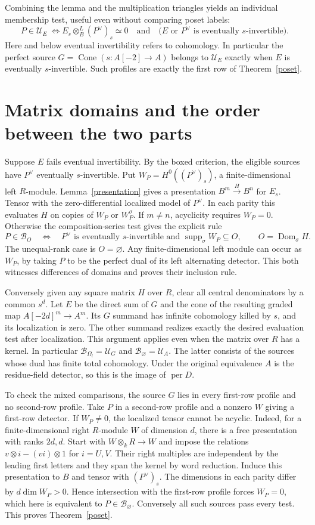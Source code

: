 \documentclass[11pt]{article}
\newcommand{\per}{\operatorname{per}}
\newcommand{\cone}{\operatorname{Cone}}
\newcommand{\supp}{\operatorname{supp}_{\sigma}}
\newcommand{\Dom}{\operatorname{Dom}_{\sigma}}
\newcommand{\prof}{\mathcal U}
\newcommand{\bb}{\mathcal B}
\begin{document}
Combining the lemma and the multiplication triangles yields an individual
membership test, useful even without comparing poset labels:
\[
 \boxed{\quad P\in\prof_E\ \Longleftrightarrow E_s\otimes_B^L(P^\vee)_s\simeq0\quad\text{and}\quad
 \big(E\text{ or }P^\vee\text{ is eventually }s\text{-invertible}\big).\quad}
\]
Here and below eventual invertibility refers to cohomology. In particular
the perfect source $G=\cone(s:A[-2]\to A)$ belongs to $\prof_E$
exactly when $E$ is eventually $s$-invertible. Such profiles are exactly
the first row of Theorem~\ref{poset}.

\section{Matrix domains and the order between the two parts}
Suppose $E$ fails eventual invertibility. By the boxed criterion, the
eligible sources have $P^\vee$ eventually $s$-invertible. Put
$W_P=H^0((P^\vee)_s)$, a finite-dimensional left $R$-module.
Lemma~\ref{presentation} gives a presentation $B^m\xrightarrow{H}B^n$
for $E_s$. Tensor with the zero-differential localized model of $P^\vee$.
In each parity this evaluates $H$ on copies of $W_P$ or $W_P^\sigma$.
If $m\ne n$, acyclicity requires $W_P=0$. Otherwise the composition-series
test gives the explicit rule
\[
  P\in\bb_O\quad\Longleftrightarrow\quad P^\vee\text{ is eventually }
  s\text{-invertible and }\supp W_P\subseteq O,
  \qquad O=\Dom H .
\]
The unequal-rank case is $O=\varnothing$. Any finite-dimensional left
module can occur as $W_P$, by taking $P$ to be the perfect dual of its
left alternating detector. This both witnesses differences of domains
and proves their inclusion rule.

Conversely given any square matrix $H$ over $R$, clear all central
denominators by a common $s^d$. Let $E$ be the direct sum of $G$ and
the cone of the resulting graded map $A[-2d]^m\to A^m$. Its $G$
summand has infinite cohomology killed by $s$, and its localization is
zero. The other summand realizes exactly the desired evaluation test
after localization. This argument applies even when the matrix over $R$
has a kernel. In particular $\bb_{\Omega_l}=\prof_G$ and
$\bb_\varnothing=\prof_A$. The latter consists of the sources whose
dual has finite total cohomology. Under the original equivalence
$A$ is the residue-field detector, so this is the image of $\per D$.

To check the mixed comparisons, the source $G$ lies in every first-row
profile and no second-row profile. Take $P$ in a second-row profile and
a nonzero $W$ giving a first-row detector. If $W_P\ne0$, the localized
tensor cannot be acyclic. Indeed, for a finite-dimensional right
$R$-module $W$ of dimension $d$, there is a free presentation with
ranks $2d,d$. Start with $W\otimes_k R\to W$ and impose the relations
$v\otimes i-(vi)\otimes1$ for $i=U,V$. Their right multiples are
independent by the leading first letters and they span the kernel by
word reduction. Induce this presentation to $B$ and tensor with
$(P^\vee)_s$. The dimensions in each parity differ by $d\dim W_P>0$.
Hence intersection with the first-row profile forces $W_P=0$, which
here is equivalent to $P\in\bb_\varnothing$. Conversely all such
sources pass every test. This proves Theorem~\ref{poset}.
\end{document}
